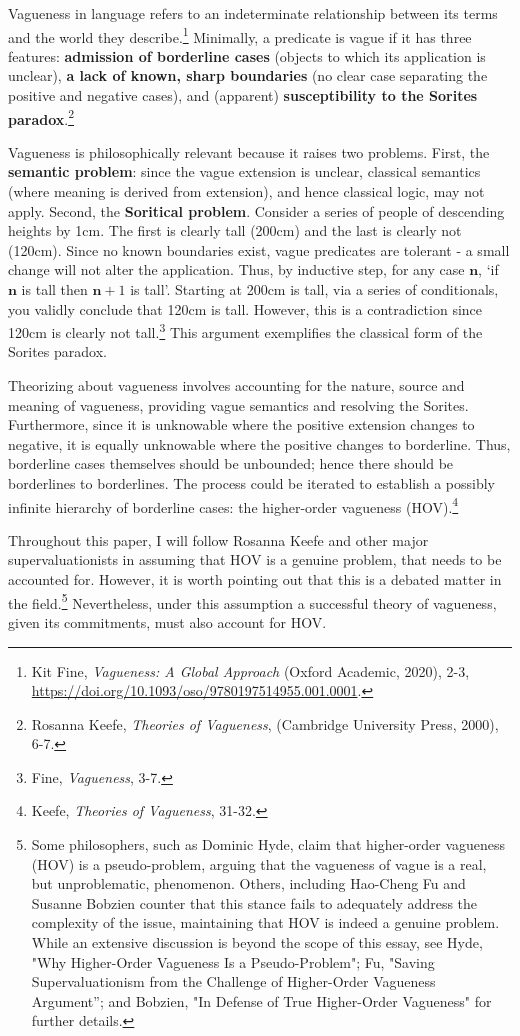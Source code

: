 Vagueness in language refers to an indeterminate relationship between
its terms and the world they describe.\footnote{Kit Fine,
  \emph{Vagueness: A Global Approach} (Oxford Academic, 2020), 2-3,
  \url{https://doi.org/10.1093/oso/9780197514955.001.0001}.} Minimally,
a predicate is vague if it has three features: \textbf{admission of
borderline cases} (objects to which its application is unclear),
\textbf{a lack of known, sharp boundaries} (no clear case separating the
positive and negative cases), and (apparent) \textbf{susceptibility to
the Sorites paradox}.\footnote{Rosanna Keefe, \emph{Theories of
  Vagueness}, (Cambridge University Press, 2000), 6-7.}

Vagueness is philosophically relevant because it raises two problems.
First, the \textbf{semantic problem}: since the vague extension is
unclear, classical semantics (where meaning is derived from extension),
and hence classical logic, may not apply. Second, the \textbf{Soritical
problem}. Consider a series of people of descending heights by 1cm. The
first is clearly tall (200cm) and the last is clearly not (120cm). Since
no known boundaries exist, vague predicates are tolerant - a small
change will not alter the application. Thus, by inductive step, for any
case $\mathbf{n}$, `if $\mathbf{n}$ is tall then $\mathbf{n}+1$ is tall'.
Starting at 200cm is tall, via a series of conditionals, you validly
conclude that 120cm is tall. However, this is a contradiction since
120cm is clearly not tall.\footnote{Fine, \emph{Vagueness}, 3-7.} This
argument exemplifies the classical form of the Sorites paradox.

Theorizing about vagueness involves accounting for the nature, source
and meaning of vagueness, providing vague semantics and resolving the
Sorites. Furthermore, since it is unknowable where the positive
extension changes to negative, it is equally unknowable where the
positive changes to borderline. Thus, borderline cases themselves should
be unbounded; hence there should be borderlines to borderlines. The
process could be iterated to establish a possibly infinite hierarchy of
borderline cases: the higher-order vagueness (HOV).\footnote{Keefe,
  \emph{Theories of Vagueness}, 31-32.}

Throughout this paper, I will follow Rosanna Keefe and other major
supervaluationists in assuming that HOV is a genuine problem, that needs
to be accounted for. However, it is worth pointing out that this is a
debated matter in the field.\footnote{Some philosophers, such as Dominic
  Hyde, claim that higher-order vagueness (HOV) is a pseudo-problem,
  arguing that the vagueness of vague is a real, but unproblematic,
  phenomenon. Others, including Hao-Cheng Fu and Susanne Bobzien counter
  that this stance fails to adequately address the complexity of the
  issue, maintaining that HOV is indeed a genuine problem. While an
  extensive discussion is beyond the scope of this essay, see Hyde, "Why
  Higher-Order Vagueness Is a Pseudo-Problem"; Fu, "Saving
  Supervaluationism from the Challenge of Higher-Order Vagueness
  Argument''; and Bobzien, "In Defense of True Higher-Order Vagueness"
  for further details.} Nevertheless, under this assumption a successful
theory of vagueness, given its commitments, must also account for HOV.

